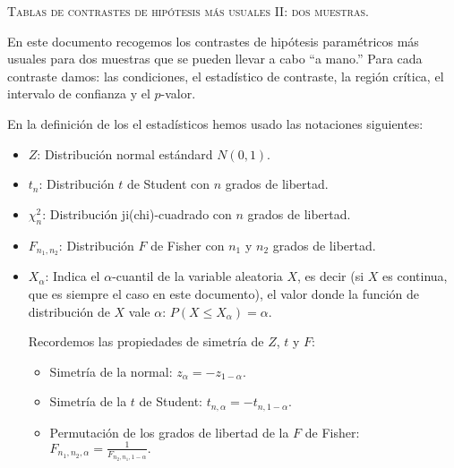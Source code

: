 \documentclass{article}
\begin{document}

\newcommand{\pp}[1]{P(#1\right)}
\newcommand{\vegeu}[1]{{(\footnotesize vegeu (#1))}}
\renewcommand{\thecas}{\Roman{cas}}
\newcommand{\posacas}{\addtocounter{cas}{1}{\bf \thecas}}


\begin{center}
\textsc{Tablas de contrastes de hipótesis más usuales II: dos muestras.}
\end{center}
\vspace*{2cm}

\noindent En este documento recogemos los contrastes de hipótesis paramétricos más usuales para dos muestras  que se pueden llevar a cabo ``a mano.'' Para cada contraste damos: las condiciones, el estadístico
de contraste, la región crítica, el intervalo de confianza y el $p$-valor.

En la definición de los el estadísticos hemos usado las notaciones siguientes:
\begin{itemize}
\item  $Z$: {Distribución normal estándard $N(0,1)$.} 
\item $t_n$: {Distribución
$t$ de Student con $n$ grados de libertad.} 
\item $\chi_n^2$: {Distribución
ji(chi)-cuadrado con $n$ grados de libertad.} 
\item $F_{n_1,n_2}$: {Distribución $F$ de
Fisher  con $n_1$ y $n_2$ grados de libertad.}
\item $X_\alpha$: Indica el $\alpha$-cuantil de la variable aleatoria $X$, es decir (si $X$ es continua, que es siempre el caso en este documento), el valor donde la
función de distribución de $X$ vale $\alpha$: $P(X\leq X_\alpha
)=\alpha$. 

Recordemos las propiedades de simetría de $Z$, $t$ y $F$:
\begin{itemize}
\item Simetría de la normal: $z_\alpha = -z_{1-\alpha}.$
\item Simetría de la $t$ de Student: $t_{n,\alpha} = -t_{n,1-\alpha}.$
\item Permutación de los grados de libertad de la $F$ de Fisher: $F_{n_1,n_2,\alpha}=\frac{1}{F_{n_2,n_1,1-\alpha}}.$
\end{itemize}
\end{itemize}
\end{document}
